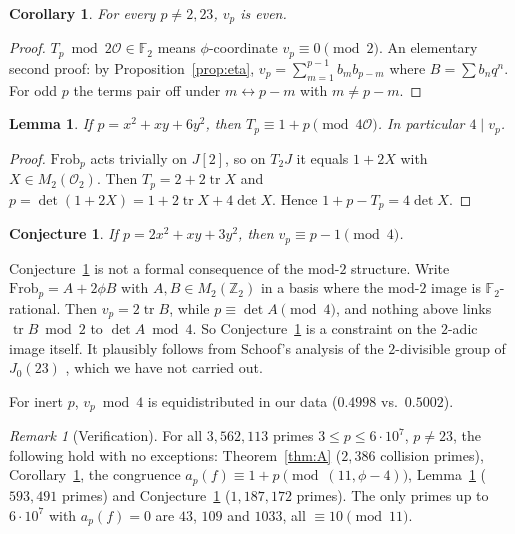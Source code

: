 \documentclass[11pt]{amsart}
\newtheorem{lemma}[theorem]{Lemma}
\newtheorem{corollary}[theorem]{Corollary}
\newtheorem{conjecture}[theorem]{Conjecture}
\theoremstyle{definition}
\theoremstyle{remark}
\newtheorem{remark}[theorem]{Remark}
\newcommand{\Z}{\mathbb{Z}}
\newcommand{\F}{\mathbb{F}}
\newcommand{\cO}{\mathcal{O}}
\newcommand{\Frob}{\mathrm{Frob}}
\newcommand{\tr}{\operatorname{tr}}
\begin{document}
\begin{corollary}\label{cor:even}
For every $p\neq2,23$, $v_p$ is even.
\end{corollary}

\begin{proof}
$T_p\bmod 2\cO\in\F_2$ means $\phi$-coordinate $v_p\equiv0\pmod2$. An elementary second proof: by Proposition~\ref{prop:eta}, $v_p=\sum_{m=1}^{p-1}b_mb_{p-m}$ where $B=\sum b_nq^n$. For odd $p$ the terms pair off under $m\leftrightarrow p-m$ with $m\neq p-m$.
\end{proof}

\begin{lemma}\label{lem:R1}
If $p=x^2+xy+6y^2$, then $T_p\equiv1+p\pmod{4\cO}$. In particular $4\mid v_p$.
\end{lemma}

\begin{proof}
$\Frob_p$ acts trivially on $J[2]$, so on $T_2J$ it equals $1+2X$ with $X\in M_2(\cO_2)$. Then $T_p=2+2\tr X$ and $p=\det(1+2X)=1+2\tr X+4\det X$. Hence $1+p-T_p=4\det X$.
\end{proof}

\begin{conjecture}\label{conj:R2}
If $p=2x^2+xy+3y^2$, then $v_p\equiv p-1\pmod4$.
\end{conjecture}

Conjecture~\ref{conj:R2} is not a formal consequence of the mod-$2$ structure. Write $\Frob_p=A+2\phi B$ with $A,B\in M_2(\Z_2)$ in a basis where the mod-$2$ image is $\F_2$-rational. Then $v_p=2\tr B$, while $p\equiv\det A\pmod 4$, and nothing above links $\tr B\bmod2$ to $\det A\bmod4$. So Conjecture~\ref{conj:R2} is a constraint on the $2$-adic image itself. It plausibly follows from Schoof's analysis of the $2$-divisible group of $J_0(23)$ \cite{Schoof}, which we have not carried out.

For inert $p$, $v_p\bmod4$ is equidistributed in our data ($0.4998$ vs.\ $0.5002$).

\begin{remark}[Verification]
For all $3{,}562{,}113$ primes $3\le p\le6\cdot10^7$, $p\neq23$, the following hold with no exceptions: Theorem~\ref{thm:A} ($2{,}386$ collision primes), Corollary~\ref{cor:even}, the congruence $a_p(f)\equiv1+p\pmod{(11,\phi-4)}$, Lemma~\ref{lem:R1} ($593{,}491$ primes) and Conjecture~\ref{conj:R2} ($1{,}187{,}172$ primes). The only primes up to $6\cdot10^7$ with $a_p(f)=0$ are $43$, $109$ and $1033$, all $\equiv10\pmod{11}$.
\end{remark}
\end{document}
